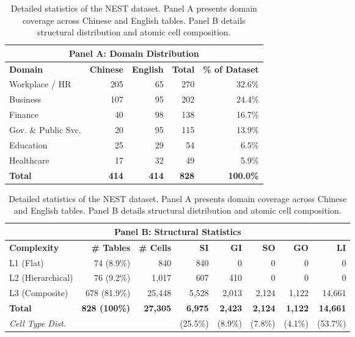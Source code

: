\begin{table}[t]
  \centering
  \caption{Detailed statistics of the NEST dataset. Panel A presents domain coverage across Chinese and English tables. Panel B details structural distribution and atomic cell composition.}
  \label{tab:dataset_statistics}
  \small
  \begin{tabular}{lrrrr}
    \toprule
    \multicolumn{5}{c}{\textbf{Panel A: Domain Distribution}} \\
    \midrule
    \textbf{Domain} & \textbf{Chinese} & \textbf{English} & \textbf{Total} & \textbf{\% of Dataset} \\
    \midrule
    Workplace / HR & 205 & 65 & 270 & 32.6\% \\
    Business & 107 & 95 & 202 & 24.4\% \\
    Finance & 40 & 98 & 138 & 16.7\% \\
    Gov. \& Public Svc. & 20 & 95 & 115 & 13.9\% \\
    Education & 25 & 29 & 54 & 6.5\% \\
    Healthcare & 17 & 32 & 49 & 5.9\% \\
    \midrule
    \textbf{Total} & \textbf{414} & \textbf{414} & \textbf{828} & \textbf{100.0\%} \\
    \bottomrule
  \end{tabular}

  \vspace{0.6em}

  \begin{tabular}{lrrrrrrr}
    \toprule
    \multicolumn{8}{c}{\textbf{Panel B: Structural Statistics}} \\
    \midrule
    \textbf{Complexity} & \textbf{\# Tables} & \textbf{\# Cells} & \textbf{SI} & \textbf{GI} & \textbf{SO} & \textbf{GO} & \textbf{LI} \\
    \midrule
    L1 (Flat) & 74 (8.9\%) & 840 & 840 & 0 & 0 & 0 & 0 \\
    L2 (Hierarchical) & 76 (9.2\%) & 1,017 & 607 & 410 & 0 & 0 & 0 \\
    L3 (Composite) & 678 (81.9\%) & 25,448 & 5,528 & 2,013 & 2,124 & 1,122 & 14,661 \\
    \midrule
    \textbf{Total} & \textbf{828 (100\%)} & \textbf{27,305} & \textbf{6,975} & \textbf{2,423} & \textbf{2,124} & \textbf{1,122} & \textbf{14,661} \\
    \textit{Cell Type Dist.} & & & (25.5\%) & (8.9\%) & (7.8\%) & (4.1\%) & (53.7\%) \\
    \bottomrule
  \end{tabular}
\end{table}
